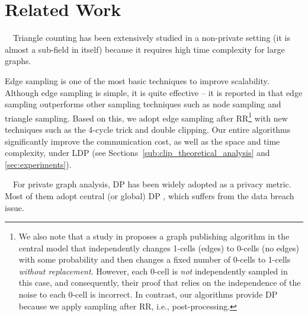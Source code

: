 \section{Related Work}
\label{sec:related}
~~Triangle
counting has been extensively studied in a non-private setting \cite{Bera_KDD20,Bera_PODS20,Chu_KDD11,Eden_FOCS15,Seshadhri_SDM13,Suri_WWW11,Tsourakakis_KDD09,Wu_TKDE16} 
(it is almost a sub-field in itself)
because it requires high time complexity for large graphs.

Edge sampling \cite{Bera_PODS20,Eden_FOCS15,Tsourakakis_KDD09,Wu_TKDE16} is one of the most basic techniques to improve 
scalability.
Although edge sampling is simple, it is quite effective -- it is reported in \cite{Wu_TKDE16} that edge sampling outperforms other sampling techniques such as node sampling and triangle sampling.
Based on this, we adopt edge sampling after RR\footnote{We also note that a study in \cite{Nguyen_TDP16} proposes a graph publishing algorithm in the central model that independently changes 1-cells (edges) to 0-cells (no edges) with some probability and then 
changes a fixed number of 0-cells to 1-cells \textit{without replacement}. 
However, each 0-cell is \textit{not} independently sampled in this case, and consequently, 
their proof that relies on the independence of the noise to each 0-cell is incorrect. 
In contrast, our algorithms provide DP because we apply sampling after RR, i.e., post-processing.} 
with new techniques such as the 4-cycle trick and double clipping.
Our entire algorithms significantly improve the communication cost, as well as the space and time complexity, under LDP (see Sections~\ref{sub:clip_theoretical_analysis}
and \ref{sec:experiments}).

\smallskip
{}~~For private graph analysis, DP has been widely adopted as a privacy metric.
Most of them adopt central (or global) DP
\cite{Day_SIGMOD16,Ding_TKDE21,Hay_ICDM09,Karwa_PVLDB11,Kasiviswanathan_TCC13,Raskhodnikova_arXiv15,Zhang_SIGMOD15}, 
which suffers from the data breach issue.

